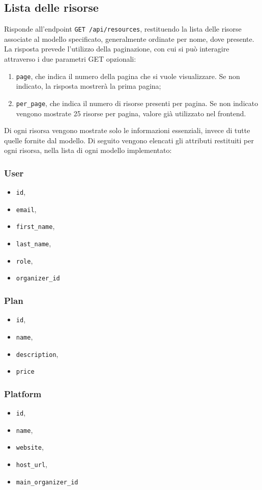 \subsection{Lista delle risorse} \label{api:lista}
Risponde all'endpoint \verb|GET /api/resources|, restituendo la lista delle risorse associate al modello specificato, generalmente ordinate per nome, dove presente. La risposta prevede l'utilizzo della paginazione, con cui si può interagire attraverso i due parametri GET opzionali:
\begin{enumerate}
	\item \verb|page|, che indica il numero della pagina che si vuole visualizzare. Se non indicato, la risposta mostrerà la prima pagina;
	\item \verb|per_page|, che indica il numero di risorse presenti per pagina. Se non indicato vengono mostrate 25 risorse per pagina, valore già utilizzato nel frontend.
\end{enumerate}
Di ogni risorsa vengono mostrate solo le informazioni essenziali, invece di tutte quelle fornite dal modello. Di seguito vengono elencati gli attributi restituiti per ogni risorsa, nella lista di ogni modello implementato:

\subsubsection{User}
\begin{itemize}
	\item \verb|id|,
	\item \verb|email|,
	\item \verb|first_name|,
	\item \verb|last_name|,
	\item \verb|role|,
	\item \verb|organizer_id|
\end{itemize}

\subsubsection{Plan}
\begin{itemize}
	\item \verb|id|,
	\item \verb|name|,
	\item \verb|description|,
	\item \verb|price|
\end{itemize}

\subsubsection{Platform}
\begin{itemize}
	\item \verb|id|,
	\item \verb|name|,
	\item \verb|website|,
	\item \verb|host_url|,
	\item \verb|main_organizer_id|
\end{itemize}

